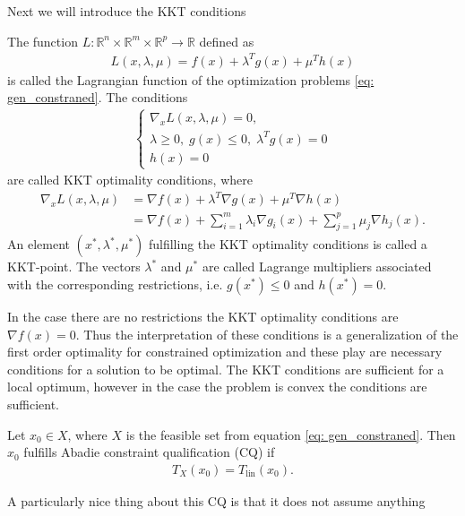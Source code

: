 Next we will introduce the KKT conditions
\begin{definition}
    The function $L: \mathbb{R}^{n} \times \mathbb{R}^{m} \times
    \mathbb{R}^{p} \to \mathbb{R}$ defined as
    \begin{align}
        L(x, \lambda, \mu)= f(x) + \lambda^{T} g(x) + \mu^{T} h(x)
    \end{align}
    is called the Lagrangian function of the optimization problems
    \ref{eq: gen_constraned}. The conditions
    \begin{align}
        \begin{cases}
            \nabla_x L(x, \lambda, \mu) = 0,\\
            \lambda \ge 0,\; g(x) \le 0,\; \lambda^{T} g(x) = 0\\
            h(x) = 0
        \end{cases}
    \end{align}
    are called KKT optimality conditions, where
    \begin{align}
        \nabla_x L(x, \lambda, \mu) &= \nabla f(x) + \lambda^{T} \nabla
            g(x) +\mu^{T} \nabla h(x)\\
        &= \nabla f(x) + \sum_{i=1}^{m} \lambda_i \nabla g_i(x)
            + \sum_{j=1}^{p} \mu_j \nabla h_j(x).
    \end{align}
    An element $(x^{*}, \lambda^{*}, \mu^{*})$ fulfilling  the KKT optimality conditions is called a KKT-point. The vectors $\lambda^{*}$ and $\mu^{*}$ are
    called Lagrange multipliers associated with the corresponding restrictions,
    i.e. $g(x^{*}) \le 0$ and $h(x^{*}) = 0$.
\end{definition}
In the case there are no restrictions the KKT optimality conditions are
$\nabla f(x) = 0$. Thus the interpretation of these conditions is a
generalization of the first order optimality for constrained optimization and
these play are necessary conditions for a solution to be optimal. The KKT
conditions are sufficient for a local optimum, however in the case the
problem is convex the conditions are sufficient.
\begin{definition}
    Let $x_0 \in X$, where $X$ is the feasible set from equation \ref{eq:
    gen_constraned}. Then $x_0$ fulfills Abadie constraint qualification (CQ)
    if
    \begin{align}
        T_X(x_0) = T_{\text{lin}}(x_0).
    \end{align}
\end{definition}
A particularly nice thing about this CQ is that it does not assume anything
